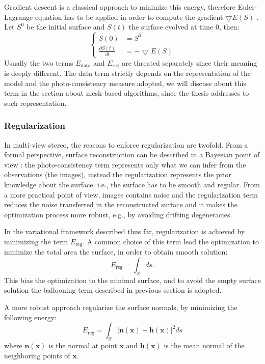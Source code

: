 Gradient descent is a classical approach to minimize this energy, therefore Euler-Lagrange equation has to be applied in order to compute the gradient $\bigtriangledown E(\mathit{S})$ \cite{hermosillo2002variational}. Let $\mathit{S}^0$ be the initial surface and $\mathit{S}(t)$ the surface evolved at time $0$, then:
\begin{equation}
 \begin{cases}
  \mathit{S}(0) &=\mathit{S}^0\\
  \frac{\partial \mathit{S}(t)}{\partial t} & = -\bigtriangledown E(\mathit{S})
 \end{cases}
\end{equation}
Usually the two terms $E_{\text{data}}$ and $E_{\text{reg}}$ are threated separately since their meaning is deeply different.
The data term strictly depends on the representation of the model and the photo-consistency measure adopted, we will discuss about this term in the section about mesh-based algorithms, since the thesis addresses to such representation.

\subsubsection{Regularization}
In multi-view stereo, the reasons to enforce regularization are twofold. From a formal perspective, surface reconstruction can be described in a Bayesian point of view \cite[11]{delaunoy2011modelisation}: the photo-consistency term represents only what we can infer from the observations (the images), instead the regularization represents the prior knowledge about the surface, i.e., the surface has to be smooth and regular. 
From a more practical point of view, images contains noise and the regularization term reduces the noise transferred in the reconstructed surface and it makes the optimization process more robust, e.g., by avoiding drifting degeneracies.

In the variational framework described thus far, regularization is achieved by minimizing the term $E_{\text{reg}}$. 
A common choice of this term lead the optimization to minimize the total area the surface, in order to obtain smooth solution:
\[
E_{\text{reg}} = \int_{\mathit{S}} ds.
\]
This bias the optimization to the minimal surface, and to avoid the empty surface solution the ballooning term described in previous section is adopted.

A more robust approach regularize the surface normals, by minimizing the following energy:
\[
E_{\text{reg}} = \int_{\mathit{S}} |\mathbf{n}(\mathbf{x}) - \mathbf{h}(\mathbf{x})|^2 ds
\]
where $\mathbf{n}(\mathbf{x})$ is the normal at point $\mathbf{x}$ and $\mathbf{h}(\mathbf{x})$ is the mean normal of the neighboring points of $\mathbf{x}$.

